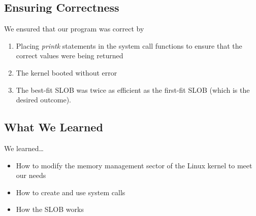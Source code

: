 \documentclass[draftclsnofoot, onecolumn, 10pt, compsoc]{IEEEtran}
\begin{document}
		\subsection{Ensuring Correctness}
			We ensured that our program was correct by
			\begin{enumerate}
				\item Placing \textit{printk} statements in the system call functions to ensure that the correct values were being returned
				\item The kernel booted without error
				\item The best-fit SLOB was twice as efficient as the first-fit SLOB (which is the desired outcome).
			\end{enumerate}
		
		\subsection{What We Learned}
			We learned\dots 
			\begin{itemize}
				\item How to modify the memory management sector of the Linux kernel to meet our needs 
				\item How to create and use system calls
				\item How the SLOB works
			\end{itemize}
		
\end{document}
